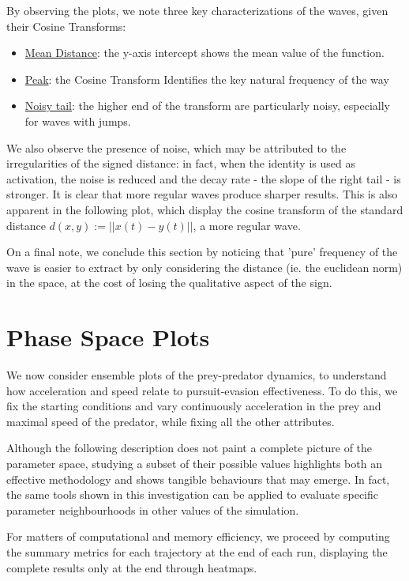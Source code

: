 \documentclass[11pt]{article}
\begin{document}
By observing the plots, we note three key characterizations of the waves, given their Cosine Transforms:
\begin{itemize}
    \item \underline{Mean Distance}: the y-axis intercept shows the mean value of the function.
    \item \underline{Peak}: the Cosine Transform Identifies the key natural frequency of the way
    \item \underline{Noisy tail}: the higher end of the transform are particularly noisy, especially for waves with jumps.
\end{itemize}

We also observe the presence of noise, which may be attributed to the irregularities of the signed distance: in fact, when the identity is used as activation, the noise is reduced and the decay rate - the slope of the right tail - is stronger. It is clear that more regular waves produce sharper results. This is also apparent in the following plot, which display the cosine transform of the standard distance $d(x,y) := ||x(t)-y(t)||$, a more regular wave.

On a final note, we conclude this section by noticing that 'pure' frequency of the wave is easier to extract by only considering the distance (ie. the euclidean norm) in the space, at the cost of losing the qualitative aspect of the sign.

\section{Phase Space Plots}
We now consider ensemble plots of the prey-predator dynamics, to understand how acceleration and speed relate to pursuit-evasion effectiveness. To do this, we fix the starting conditions and vary continuously acceleration in the prey and maximal speed of the predator, while fixing all the other attributes.

Although the following description does not paint a complete picture of the parameter space, studying a subset of their possible values highlights both an effective methodology and shows tangible behaviours that may emerge. In fact, the same tools shown in this investigation can be applied to evaluate specific parameter neighbourhoods in other values of the simulation.

For matters of computational and memory efficiency, we proceed by computing the summary metrics for each trajectory at the end of each run, displaying the complete results only at the end through heatmaps.
\end{document}
